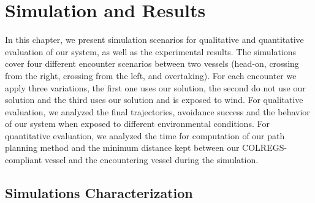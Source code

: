 \chapter{Simulation and Results}
\label{chap:5_Simulation_And_Results}
        
    In this chapter, we present simulation scenarios for qualitative and quantitative evaluation of our system, as well as the experimental results. The simulations cover four different encounter scenarios between two vessels (head-on, crossing from the right, crossing from the left, and overtaking). For each encounter we apply three variations, the first one uses our solution, the second do not use our solution and the third uses our solution and is exposed to wind. For qualitative evaluation, we analyzed the final trajectories, avoidance success and the behavior of our system when exposed to different environmental conditions. For quantitative evaluation, we analyzed the time for computation of our path planning method and the minimum distance kept between our \ac{COLREGS}-compliant vessel and the encountering vessel during the simulation.

    \section{Simulations Characterization}

    
